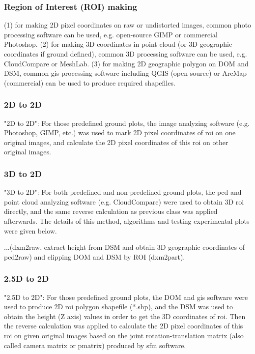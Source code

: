 \documentclass{configs/bmcart}
\begin{document}




\subsubsection*{Region of Interest (ROI) making}
(1) for making 2D pixel coordinates on raw or undistorted images, common photo processing software can be used, e.g. open-source GIMP or commercial Photoshop. (2) for making 3D coordinates in point cloud (or 3D geographic coordinates if ground defined), common 3D processing software can be used, e.g. CloudCompare or MeshLab. (3) for making 2D geographic polygon on DOM and DSM, common \acrfull*{gis} processing software including QGIS (open source) or ArcMap (commercial) can be used to produce required shapefiles.

\subsubsection*{2D to 2D}
"2D to 2D": For those predefined ground plots, the image analyzing software (e.g. Photoshop, GIMP, etc.) was used to mark 2D pixel coordinates of \acrshort*{roi} on one original images, and calculate the 2D pixel coordinates of this \acrshort*{roi} on other original images.

\subsubsection*{3D to 2D}
"3D to 2D": For both predefined and non-predefined ground plots, the \acrfull*{pcd} and point cloud analyzing software (e.g. CloudCompare) were used to obtain 3D \acrshort*{roi} directly, and the same reverse calculation as previous class was applied afterwards. The details of this method, algorithms and testing experimental plots were given below.

...(dxm2raw, extract height from DSM and obtain 3D geographic coordinates of pcd2raw) and clipping DOM and DSM by ROI (dxm2part).

\subsubsection*{2.5D to 2D}
"2.5D to 2D": For those predefined ground plots, the DOM and \acrfull*{gis} software were used to produce 2D \acrshort*{roi} polygon shapefile (*.shp), and the DSM was used to obtain the height (Z axis) values in order to get the 3D coordinates of \acrshort*{roi}. Then the reverse calculation was applied to calculate the 2D pixel coordinates of this \acrshort*{roi} on given original images based on the joint rotation-translation matrix (also called camera matrix or pmatrix) produced by \acrshort*{sfm} software.
\end{document}

